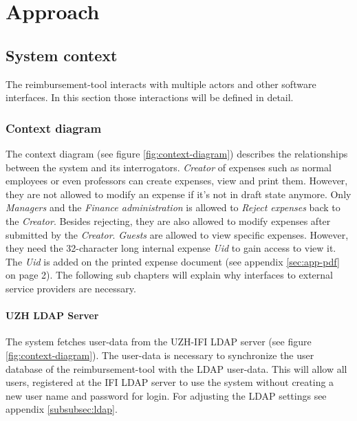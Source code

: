 \chapter{Approach}

\section{System context}

The reimbursement-tool interacts with multiple actors and other software interfaces. In this section those interactions will be defined in detail.

\subsection{Context diagram}

The context diagram (see figure \ref{fig:context-diagram}) describes the relationships between the system and its interrogators. \textit{Creator} of expenses such as normal employees or even professors can create expenses, view and print them. However, they are not allowed to modify an expense if it's not in draft state anymore. Only \textit{Managers} and the \textit{Finance administration} is allowed to \textit{Reject expenses} back to the \textit{Creator}. Besides rejecting, they are also allowed to modify expenses after submitted by the \textit{Creator}.\newline
\textit{Guests} are allowed to view specific expenses. However, they need the 32-character long internal expense \textit{Uid} to gain access to view it. The \textit{Uid} is added on the printed expense document (see appendix \ref{sec:app-pdf} on page 2).\newline
The following sub chapters will explain why interfaces to external service providers are necessary.

\subsubsection{UZH LDAP Server}

The system fetches user-data from the UZH-IFI LDAP server (see figure \ref{fig:context-diagram}). The user-data is necessary to synchronize the user database of the reimbursement-tool with the LDAP user-data. This will allow all users, registered at the IFI LDAP server to use the system without creating a new user name and password for login. For adjusting the LDAP settings see appendix \ref{subsubsec:ldap}.

